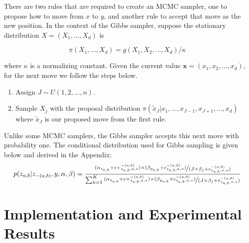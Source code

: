 \documentclass{article}%
\theoremstyle{definition}
\begin{document}
There are two rules that are required to create an MCMC sampler, one to propose how to move from $x$ to $y$, and another rule to accept that move as the new position. In the context of the Gibbs sampler, suppose the stationary distribution \textbf{$X$}$=(X_1,\ldots,X_d)$ is 

\begin{equation}
    \pi(X_1,\ldots,X_d) = g(X_1,X_2,\ldots,X_d)/ \kappa
\end{equation}

where $\kappa$ is a normalizing constant. Given the current value $\mathbf{x}=(x_1,x_2,\ldots,x_d)$, for the next move we follow the steps below.
\begin{enumerate}
    \item Assign $J\sim U(1,2,\ldots,n)$.
    \item Sample $X_j$ with the proposal distribution $\pi(\tilde{x}_J|x_1,\ldots,x_{J-1},x_{J+1},\ldots,x_d)$ where $\tilde{x}_J$ is our proposed move from the first rule. 
\end{enumerate}

Unlike some MCMC samplers, the Gibbs sampler accepts this next move with probability one. The conditional distribution used for Gibbs sampling is given below and derived in the Appendix:
\begin{equation}
p(z_{a,b}|z_{-(a,b)},y,\alpha,\beta) = \frac{\nicefrac{(\alpha_{z_{a,b}}+ c+_{z_{a,b},a,*}^{-(a,b)})\times(\beta_{y_{a,b}}+c_{z_{a,b},a,*}^{-(a,b)})}{(J \times \beta_j + c_{z_{a,b},*,*}^{-(a,b)})}}{\sum_{k=1}^{K}\nicefrac{(\alpha_{z_{a,b}}+ c+_{z_{a,b},a,*}^{-(a,b)})\times(\beta_{y_{a,b}}+c_{z_{a,b},a,*}^{-(a,b)})}{(J \times \beta_j + c_{z_{a,b},*,*}^{-(a,b)})}}
\end{equation}

\section{Implementation and Experimental Results}
\end{document}
